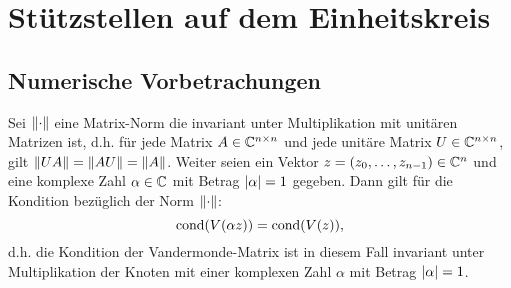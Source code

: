 \chapter{Stützstellen auf dem Einheitskreis}
\section{Numerische Vorbetrachungen}

\begin{lemma}
    Sei $\left\lVert \cdot \right\rVert$ eine Matrix-Norm die invariant unter Multiplikation mit unitären
    Matrizen ist, d.h. für jede Matrix $A \in \mathbb{C}^{n\times n}$ und jede
    unitäre Matrix $U \in \mathbb{C}^{n\times n}$, gilt $\left\lVert UA \right\rVert = \left\lVert AU \right\rVert = \left\lVert A \right\rVert$.
    Weiter seien ein Vektor $z = (z_0, \dots, z_{n-1}) \in \mathbb{C}^n$ und eine
    komplexe Zahl $\alpha \in \mathbb{C}$ mit Betrag $\left\lvert \alpha \right\rvert = 1$ gegeben.
    Dann gilt für die Kondition bezüglich der Norm $\left\lVert \cdot \right\rVert$:
    \[
        \text{cond$ \left( \text{$V(\alpha z)$} \right)$} = \text{cond$ \left( \text{$V(z)$} \right)$},
    \]
    d.h. die Kondition der Vandermonde-Matrix ist in diesem Fall invariant
    unter Multiplikation der Knoten mit einer komplexen Zahl $\alpha$ mit
    Betrag $\left\lvert \alpha \right\rvert = 1$.
\end{lemma}

